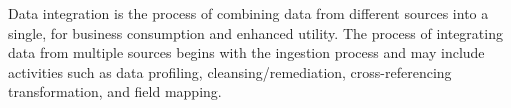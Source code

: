 %
%
Data integration is the process of combining data from different sources into a single,
 for business consumption and enhanced utility.
The process of integrating data from multiple sources begins with the ingestion process and may include activities
such as data profiling, cleansing/remediation, cross-referencing transformation, and field mapping.

